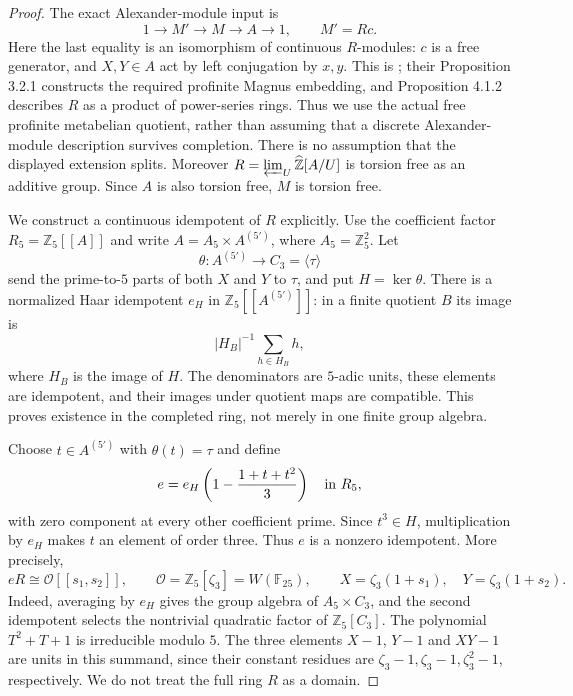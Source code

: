 \begin{proof}
The exact Alexander-module input is
\[
                 1\longrightarrow M'
                   \longrightarrow M\longrightarrow A
                   \longrightarrow1,\qquad M'=R c.
\]
Here the last equality is an isomorphism of continuous
$R$-modules: $c$ is a free generator, and $X,Y\in A$
act by left conjugation by $x,y$. This is
\citet[Corollary 4.1.5]{A_ChenDeligne2017}; their
Proposition 3.2.1 constructs the required profinite
Magnus embedding, and Proposition 4.1.2 describes $R$
as a product of power-series rings. Thus we use the
actual free profinite metabelian quotient, rather than
assuming that a discrete Alexander-module description
survives completion. There is no assumption that the
displayed extension splits. Moreover
$R=\varprojlim_U\widehat{\mathbb Z}[A/U]$ is torsion free
as an additive group. Since $A$ is also torsion free,
$M$ is torsion free.

We construct a continuous idempotent of $R$ explicitly.
Use the coefficient factor
$R_5=\mathbb Z_5[[A]]$ and write
$A=A_5\times A^{(5')}$, where
$A_5=\mathbb Z_5^2$.
Let
\[
 \theta:A^{(5')}\longrightarrow C_3=\langle\tau\rangle
\]
send the prime-to-$5$ parts of both $X$ and $Y$ to
$\tau$, and put $H=\ker\theta$.
There is a normalized Haar idempotent $e_H$ in
$\mathbb Z_5[[A^{(5')}]]$: in a finite quotient $B$
its image is
\[
              |H_B|^{-1}\sum_{h\in H_B}h,
\]
where $H_B$ is the image of $H$. The denominators are
$5$-adic units, these elements are idempotent, and their
images under quotient maps are compatible. This proves
existence in the completed ring, not merely in one
finite group algebra.

Choose $t\in A^{(5')}$ with $\theta(t)=\tau$ and define
\[
                 e=e_H\left(1-\frac{1+t+t^2}{3}\right)
                 \quad\hbox{in }R_5,
\]
with zero component at every other coefficient prime.
Since $t^3\in H$, multiplication by $e_H$ makes $t$
an element of order three. Thus $e$ is a nonzero
idempotent. More precisely,
\[
 eR\cong\mathcal O[[s_1,s_2]],\qquad
 \mathcal O=\mathbb Z_5[\zeta_3]=W(\mathbb F_{25}),
 \qquad
 X=\zeta_3(1+s_1),\quad Y=\zeta_3(1+s_2).
\]
Indeed, averaging by $e_H$ gives the group algebra
of $A_5\times C_3$, and the second idempotent selects
the nontrivial quadratic factor of
$\mathbb Z_5[C_3]$. The polynomial $T^2+T+1$ is
irreducible modulo $5$.
The three elements $X-1$, $Y-1$ and $XY-1$ are units
in this summand, since their constant residues are
$\zeta_3-1,\zeta_3-1,\zeta_3^2-1$, respectively.
We do not treat the full ring $R$ as a domain.


\end{proof}
